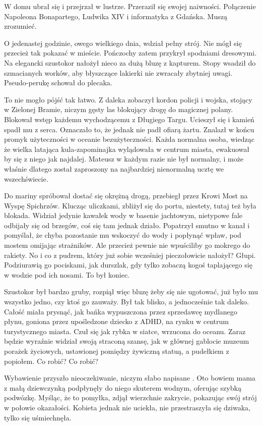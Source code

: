 W domu ubrał się i przejrzał w lustrze. Przeraził się swojej naiwności.
Połączenie Napoleona Bonapartego, Ludwika XIV i informatyka z Gdańska.
Muszą zrozumieć.

O jedenastej godzinie, owego wielkiego dnia, wdział pełny strój.
Nie mógł się przecież tak pokazać w mieście.
Pończochy zatem przykrył spodniami dresowymi.
Na elegancki szustokor nałożył nieco za dużą bluzę z kapturem.
Stopy wsadził do szmacianych worków, aby błyszczące lakierki nie zwracały zbytniej uwagi.
Pseudo-perukę schował do plecaka.

To nie mogło pójść tak łatwo.
Z daleka zobaczył kordon policji i wojska, stojący w Zielonej Bramie, niczym gęsty las blokujący drogę do magicznej polany.
Blokował wstęp każdemu wychodzącemu z Długiego Targu.
Ucieszył się i kamień spadł mu z serca. Oznaczało to, że jednak nie padł ofiarą żartu.
Znalazł w końcu promyk użyteczności w oceanie bezużyteczności. Każda normalna osoba, wiedząc że wielka latająca kula-zapominajka wylądowała w centrum miasta,
ewakuował by się z niego jak najdalej. 
Mateusz w każdym razie nie był normalny, i może właśnie dlatego został zaproszony na najbardziej nienormalną ucztę we wszechświecie.

Do mariny spróbował dostać się okrężną drogą, przebiegł przez Krowi Most na Wyspę Spichrzów.
Klucząc uliczkami, zbliżył się do portu, niestety, tutaj też była blokada.
Widział jedynie kawałek wody w basenie jachtowym, nietypowe fale odbijały się od brzegów, coś się tam jednak działo.
Popatrzył smutno w kanał i pomyślał, że chyba pozostanie mu wskoczyć do wody i popłynąć wpław, pod mostem omijając strażników.
Ale przecież pewnie nie wpuściliby go mokrego do rakiety.
No i co z pudrem, który już sobie wcześniej pieczołowicie nałożył?
Głupi. Podziurawią go pociskami, jak durszlak, gdy tylko zobaczą kogoś taplającego się w wodzie pod ich nosami.
To był koniec.

Szustokor był bardzo gruby, rozpiął więc bluzę żeby się nie ugotować, już było mu wszystko jedno, czy ktoś go zauważy.
Był tak blisko, a jednocześnie tak daleko. 
Całość miała prysnąć, jak bańka wypuszczona przez sprzedawcę mydlanego płynu, 
goniona przez upośledzone dziecko z ADHD, na rynku w centrum turystycznego miasta.
Czuł się jak rybka w siatce, wrzucona do oceanu.
Zaraz będzie wyraźnie widział swoją straconą szansę, jak w głównej gablocie muzeum porażek życiowych, ustawionej pomiędzy żywiczną statuą, a pudełkiem z popiołem.
Co robić? Co robić?

Wybawienie przyszło nieoczekiwanie, niczym słabo napisane .
Oto bowiem mama z małą dziewczynką podpłynęły do niego skuterem wodnym, oferując szybką podwózkę.
Myśląc, że to pomyłka, zdjął wierzchnie zakrycie, pokazując swój strój w połowie okazałości.
Kobieta jednak nie uciekła, nie przestraszyła się dziwaka, tylko się uśmiechnęła.

